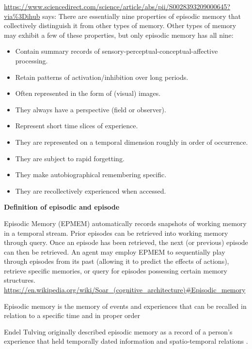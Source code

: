 \documentclass{book}
\providecommand{\ProjectDeepHeading}[2]{%
    \par\medskip\noindent\textbf{#2}\par\smallskip
}
\begin{document}
\url{https://www.sciencedirect.com/science/article/abs/pii/S0028393209000645?via%3Dihub} says:
    There are essentially nine properties of episodic memory that collectively distinguish it from other types of memory. Other types of memory may exhibit a few of these properties, but only episodic memory has all nine:
    
    \begin{itemize}
        \item Contain summary records of sensory-perceptual-conceptual-affective processing.
        \item Retain patterns of activation/inhibition over long periods.
        \item Often represented in the form of (visual) images.
        \item They always have a perspective (field or observer).
        \item Represent short time slices of experience.
        \item They are represented on a temporal dimension roughly in order of occurrence.
        \item They are subject to rapid forgetting.
        \item They make autobiographical remembering specific.
        \item They are recollectively experienced when accessed.
    \end{itemize}
    
    \ProjectDeepHeading{14}{Definition of episodic and episode}
    Episodic Memory (EPMEM) automatically records snapshots of working memory in a temporal stream. Prior episodes can be retrieved into working memory through query. Once an episode has been retrieved, the next (or previous) episode can then be retrieved. An agent may employ EPMEM to sequentially play through episodes from its past (allowing it to predict the effects of actions), retrieve specific memories, or query for episodes possessing certain memory structures. \url{https://en.wikipedia.org/wiki/Soar_(cognitive_architecture)\#Episodic_memory}
    
    Episodic memory is the memory of events and experiences that can be recalled in relation to a specific time and in proper order \cite{tulving-2002-episodic-memory-from-mind-to-brain}
    
    Endel Tulving originally described episodic memory as a record of a person's experience that held temporally dated information and spatio-temporal relations \cite{tulving-1983-elements-of-episodic-memory}.
    
\end{document}
